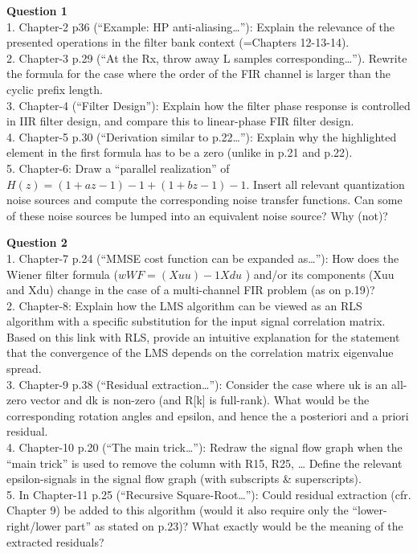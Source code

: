 \documentclass[
  a4paper,
  ,captions=tableheading
]{scrartcl}
\begin{document}
\textbf{Question 1}\\
1. Chapter-2 p36 (``Example: HP anti-aliasing\ldots''): Explain the
relevance of the presented operations in the filter bank context
(=Chapters 12-13-14).\\
2. Chapter-3 p.29 (``At the Rx, throw away L samples
corresponding\ldots''). Rewrite the formula for the case where the order
of the FIR channel is larger than the cyclic prefix length.\\
3. Chapter-4 (``Filter Design''): Explain how the filter phase response
is controlled in IIR filter design, and compare this to linear-phase FIR
filter design.\\
4. Chapter-5 p.30 (``Derivation similar to p.22\ldots''): Explain why
the highlighted element in the first formula has to be a zero (unlike in
p.21 and p.22).\\
5. Chapter-6: Draw a ``parallel realization'' of
\(H(z)=(1+az-1)-1 + (1+bz-1)-1\). Insert all relevant quantization noise
sources and compute the corresponding noise transfer functions. Can some
of these noise sources be lumped into an equivalent noise source? Why
(not)?

\textbf{Question 2}\\
1. Chapter-7 p.24 (``MMSE cost function can be expanded as\ldots{}''):
How does the Wiener filter formula (\(wWF=(Xuu)-1Xdu\) ) and/or its
components (Xuu and Xdu) change in the case of a multi-channel FIR
problem (as on p.19)?\\
2. Chapter-8: Explain how the LMS algorithm can be viewed as an RLS
algorithm with a specific substitution for the input signal correlation
matrix. Based on this link with RLS, provide an intuitive explanation
for the statement that the convergence of the LMS depends on the
correlation matrix eigenvalue spread.\\
3. Chapter-9 p.38 (``Residual extraction\ldots''): Consider the case
where uk is an all-zero vector and dk is non-zero (and R{[}k{]} is
full-rank). What would be the corresponding rotation angles and epsilon,
and hence the a posteriori and a priori residual.\\
4. Chapter-10 p.20 (``The main trick\ldots''): Redraw the signal flow
graph when the ``main trick'' is used to remove the column with R15,
R25, \ldots{} Define the relevant epsilon-signals in the signal flow
graph (with subscripts \& superscripts).\\
5. In Chapter-11 p.25 (``Recursive Square-Root\ldots''): Could residual
extraction (cfr. Chapter 9) be added to this algorithm (would it also
require only the ``lower-right/lower part'' as stated on p.23)? What
exactly would be the meaning of the extracted residuals?
\end{document}
